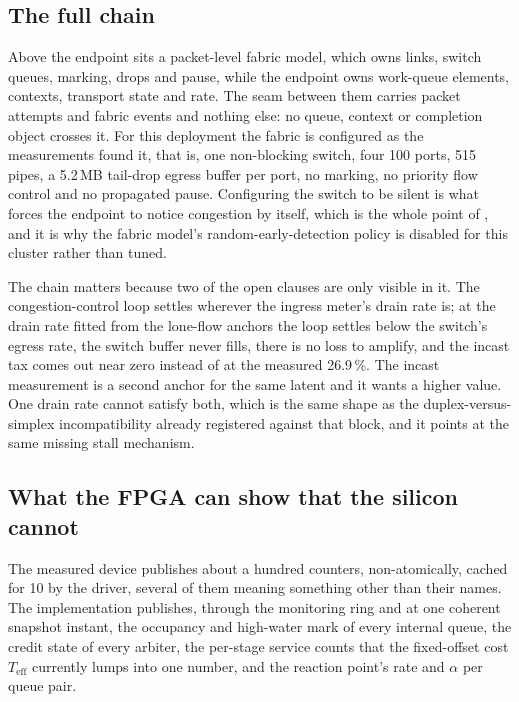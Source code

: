 \subsection{The full chain}

Above the endpoint sits a packet-level fabric model, which owns links, switch
queues, marking, drops and pause, while the endpoint owns work-queue elements,
contexts, transport state and rate. The seam between them carries packet
attempts and fabric events and nothing else: no queue, context or completion
object crosses it. For this deployment the fabric is configured as the
measurements found it, that is, one non-blocking switch, four 100\Gbps{} ports,
515\nS{} pipes, a 5.2\,MB tail-drop egress buffer per port, no marking, no
priority flow control and no propagated pause. Configuring the switch to be
silent is what forces the endpoint to notice congestion by itself, which is the
whole point of , and it is why the fabric model's random-early-detection
policy is disabled for this cluster rather than tuned.

The chain matters because two of the open clauses are only visible in it. The
congestion-control loop settles wherever the ingress meter's drain rate is; at
the drain rate fitted from the lone-flow anchors the loop settles below the
switch's egress rate, the switch buffer never fills, there is no loss to
amplify, and the incast tax comes out near zero instead of at the measured
26.9\,\%. The incast measurement is a second anchor for the same latent and it
wants a higher value. One drain rate cannot satisfy both, which is the same
shape as the duplex-versus-simplex incompatibility already registered against
that block, and it points at the same missing stall mechanism.

\subsection{What the FPGA can show that the silicon cannot}
\label{sec:verify:fpga}

The measured device publishes about a hundred counters, non-atomically, cached
for 10\mS{} by the driver, several of them meaning something other than their
names. The implementation publishes, through the monitoring ring and at one
coherent snapshot instant, the occupancy and high-water mark of every internal
queue, the credit state of every arbiter, the per-stage service counts that the
fixed-offset cost $T_{\text{eff}}$ currently lumps into one number, and the
reaction point's rate and $\alpha$ per queue pair.

